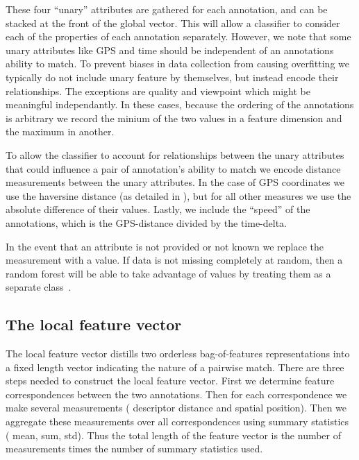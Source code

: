 These four ``unary'' attributes are gathered for each annotation, and can be
  stacked at the front of the global vector.
This will allow a classifier to consider each of the properties of each
  annotation separately.
However, we note that some unary attributes like GPS and time should be
  independent of an annotations ability to match.
To prevent biases in data collection from causing overfitting we typically do
  not include unary feature by themselves, but instead encode their
  relationships.
The exceptions are quality and viewpoint which might be meaningful
  independantly.
In these cases, because the ordering of the annotations is arbitrary we record
  the minium of the two values in a feature dimension and the maximum in
  another.

To allow the classifier to account for relationships between the unary
  attributes that could influence a pair of annotation's ability to match we
  encode distance measurements between the unary attributes.
In the case of GPS coordinates we use the haversine distance (as detailed in
  ), but for all other measures we use the absolute
  difference of their values.
Lastly, we include the ``speed'' of the annotations, which is the GPS-distance
  divided by the time-delta.

In the event that an attribute is not provided or not known we replace the
  measurement with a \nan{} value.
If data is not missing completely at random, then a random forest will be able
  to take advantage of \nan{} values by treating them as a separate
  class~\cite{ding_investigation_2010}.


\subsection{The local feature vector}
The local feature vector distills two orderless bag-of-features
  representations into a fixed length vector indicating the nature of a pairwise
  match.
There are three steps needed to construct the local feature vector.
First we determine feature correspondences between the two annotations.
Then for each correspondence we make several measurements (\eg{} descriptor
  distance and spatial position).
Then we aggregate these measurements over all correspondences using summary
  statistics (\eg{} mean, sum, std).
Thus the total length of the feature vector is the number of measurements
  times the number of summary statistics used.

